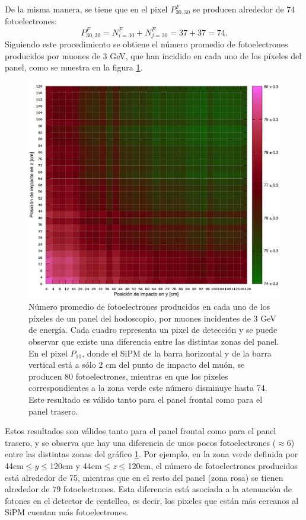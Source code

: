 \documentclass[12pt,oneside,openany,letter]{book}
\begin{document}
De la misma manera, se tiene que en el pixel $P^{F}_{30,30}$ se producen alrededor de 74 fotoelectrones:
\begin{equation}
P^{F}_{30,30}= N^{F}_{i=30}+N^{F}_{j=30}= 37+37 = 74.
\end{equation}
Siguiendo este procedimiento se obtiene el número promedio de fotoelectrones producidos por muones de 3 GeV, que han incidido en cada uno de los píxeles del panel, como se muestra en la figura \ref{atenuacion_panel_round}. 
\begin{figure}[h!]
    \centering
        \includegraphics[scale=0.6]{images/atenuacion_panel_nuevo_2.png}
   \caption[Respuesta de los paneles del hodoscopio]{N\'umero promedio de fotoelectrones producidos en cada uno de los p\'ixeles de un panel del hodoscopio, por muones incidentes de 3 GeV de energ\'ia. Cada cuadro representa un pixel de detecci\'on y se puede observar que existe una diferencia entre las distintas zonas del panel. En el pixel $P_{11}$, donde el SiPM de la barra horizontal y de la barra vertical está a sólo 2 cm del punto de impacto del muón, se producen 80 fotoelectrones, mientras en que los pixeles correspondientes a la zona verde este n\'umero disminuye hasta 74. Este resultado es v\'alido tanto para el panel frontal como para el panel trasero.}\label{atenuacion_panel_round}
\end{figure}

Estos resultados son v\'alidos tanto para el panel frontal como para el panel trasero, y se observa que hay una diferencia de unos pocos fotoelectrones ($\approx 6$) entre las distintas zonas del gr\'afico \ref{atenuacion_panel_round}. Por ejemplo, en la zona verde definida por 44cm$\leq y \leq$120cm y 44cm$\leq z \leq$120cm, el n\'umero de fotoelectrones producidos est\'a alrededor de 75, mientras que en el resto del panel (zona rosa) se tienen alrededor de 79 fotoelectrones. Esta diferencia est\'a asociada a la atenuaci\'on de fotones en el detector de centelleo, es decir, los pixeles que est\'an m\'as cercanos al SiPM cuentan m\'as fotoelectrones. 
\end{document}
